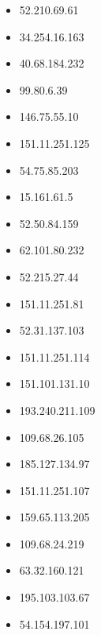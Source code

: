 \documentclass{article}
\begin{document}
\begin{itemize}
        \item 52.210.69.61
    
        \item 34.254.16.163
    
        \item 40.68.184.232
    
        \item 99.80.6.39
    
        \item 146.75.55.10
    
        \item 151.11.251.125
    
        \item 54.75.85.203
    
        \item 15.161.61.5
    
        \item 52.50.84.159
    
        \item 62.101.80.232
    
        \item 52.215.27.44
    
        \item 151.11.251.81
    
        \item 52.31.137.103
    
        \item 151.11.251.114
    
        \item 151.101.131.10
    
        \item 193.240.211.109
    
        \item 109.68.26.105
    
        \item 185.127.134.97
    
        \item 151.11.251.107
    
        \item 159.65.113.205
    
        \item 109.68.24.219
    
        \item 63.32.160.121
    
        \item 195.103.103.67
    
        \item 54.154.197.101
    

\end{itemize}
\end{document}
